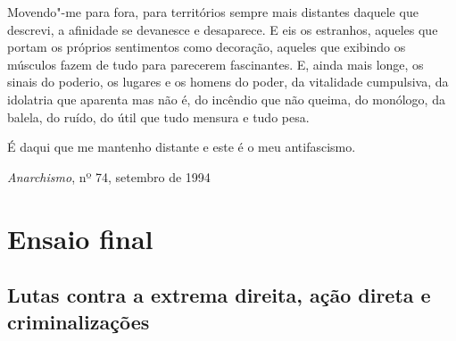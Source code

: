 Movendo"-me para fora, para territórios sempre mais distantes daquele que
descrevi, a afinidade se devanesce e desaparece. E eis os estranhos,
aqueles que portam os próprios sentimentos como decoração, aqueles que
exibindo os músculos fazem de tudo para parecerem fascinantes. E, ainda
mais longe, os sinais do poderio, os lugares e os homens do poder, da
vitalidade cumpulsiva, da idolatria que aparenta mas não é, do incêndio
que não queima, do monólogo, da balela, do ruído, do útil que tudo
mensura e tudo pesa.

É daqui que me mantenho distante e este é o meu antifascismo.

\hfill{}\emph{Anarchismo}, nº 74, setembro de 1994


\part{Ensaio final}

\chapter{Lutas contra a extrema direita, ação direta e criminalizações}

\lipsum[5]
